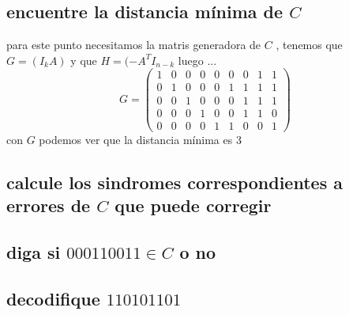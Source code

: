 \documentclass[10pt,a4paper]{article} %
\begin{document}
        \subsection{encuentre la distancia mínima de $C$}
        para este punto necesitamos la matris generadora de $C$ , tenemos que
        $G = (I_k A)$ y que $H = (-A ^{T} I_{n-k}$ luego ...
        \begin{equation}
            G = \begin{pmatrix}
                1 & 0 & 0 & 0 & 0 & 0 & 0 & 1 & 1
                \\
                0 & 1 & 0 & 0 & 0 & 1 & 1 & 1 & 1
                \\
                0 & 0 & 1 & 0 & 0 & 0 & 1 & 1 & 1
                \\
                0 & 0 & 0 & 1 & 0 & 0 & 1 & 1 & 0
                \\
                0 & 0 & 0 & 0 & 1 & 1 & 0 & 0 & 1
            \end{pmatrix}
        \end{equation}
        con $G$ podemos ver que la distancia mínima es $3$

        \subsection{calcule los sindromes correspondientes a errores de
            $C$ que puede corregir}





        \subsection{diga si $000110011 \in C$   o no}





        \subsection{decodifique $110101101$}































    \nocite{*}
    
    
\end{document}
